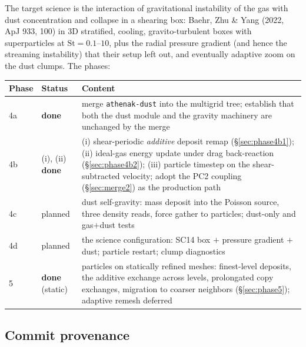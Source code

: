 \documentclass[11pt]{article}
\newcommand{\code}[1]{\texttt{#1}}
\begin{document}
The target science is the interaction of gravitational instability of the gas with
dust concentration and collapse in a shearing box: Baehr, Zhu \& Yang (2022, ApJ 933,
100) in 3D stratified, cooling, gravito-turbulent boxes with superparticles at
$\mathrm{St} = 0.1$--$10$, plus the radial pressure gradient (and hence the streaming
instability) that their setup left out, and eventually adaptive zoom on the dust
clumps. The phases:

\begin{center}
\small
\begin{tabular}{@{}llp{8.6cm}@{}}
\toprule
Phase & Status & Content \\
\midrule
4a & \textbf{done} & merge \code{athenak-dust} into the multigrid tree; establish that both
     the dust module and the gravity machinery are unchanged by the merge \\
4b & (i), (ii) \textbf{done} & (i) shear-periodic \emph{additive} deposit remap
     (\S\ref{sec:phase4b1}); (ii) ideal-gas energy update under drag back-reaction
     (\S\ref{sec:phase4b2}); (iii) particle timestep on the shear-subtracted velocity;
     adopt the PC2 coupling (\S\ref{sec:merge2}) as the production path \\
4c & planned & dust self-gravity: mass deposit into the Poisson source, three density
     reads, force gather to particles; dust-only and gas$+$dust tests \\
4d & planned & the science configuration: SC14 box $+$ pressure gradient $+$ dust;
     particle restart; clump diagnostics \\
5  & \textbf{done} (static) & particles on statically refined meshes: finest-level
     deposits, the additive exchange across levels, prolongated copy exchanges, migration
     to coarser neighbors (\S\ref{sec:phase5}); adaptive remesh deferred \\
\bottomrule
\end{tabular}
\end{center}

\subsection{Commit provenance}
\end{document}
